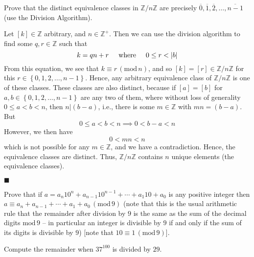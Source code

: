 \documentclass[12pt]{article}
\renewcommand{\qed}{\hfill$\blacksquare$}
\renewenvironment{proof}{\begin{addmargin}[1em]{0em}\begin{newproof}}{\end{newproof}\end{addmargin}\qed}
\newenvironment{problem}[2][Exercise]{\begin{trivlist}
\item[\hskip \labelsep {\bfseries #1}\hskip \labelsep {\bfseries #2.}]}{\end{trivlist}}
\begin{document}
\begin{problem}{0.3.2}
Prove that the distinct equivalence classes in $\mathbb{Z}/n\mathbb{Z}$ are precisely $\overline{0}, \overline{1},\overline{2},\ldots,\overline{n-1}$ (use the Division Algorithm).
\end{problem}
\begin{proof}
Let $\left[k\right]\in \mathbb{Z}$ arbitrary, and $n\in \mathbb{Z}^+$. Then we can use the division algorithm to find some $q,r \in \mathbb{Z}$ such that
$$ k = qn + r \hspace{5mm} \text{where} \hspace{5mm} 0 \leq r < \left|b\right| $$
From this equation, we see that $k \equiv r \, \left(\text{mod} \, n\right)$, and so $\left[k\right] =  \left[r\right] \in \mathbb{Z}/n\mathbb{Z}$ for this $r \in \left\{ 0,1,2,\ldots,n-1\right\}$. Hence, any arbitrary equivalence class of $\mathbb{Z}/n\mathbb{Z}$ is one of these classes. These classes are also distinct, because if $\left[a\right]= \left[b\right]$ for $a,b \in \left\{0,1,2,\ldots,n-1\right\}$ are any two of them, where without loss of generality $0\leq a <b < n$, then $n|\left(b-a\right)$, i.e., there is some $m\in \mathbb{Z}$ with $mn = \left(b-a\right)$. But $$ 0 \leq a < b < n \implies 0 < b-a < n$$
However, we then have
$$ 0 < mn < n $$
which is not possible for any $m\in \mathbb{Z}$, and we have a contradiction. Hence, the equivalence classes are distinct. Thus, $\mathbb{Z}/n\mathbb{Z}$ contains $n$ unique elements (the equivalence classes).
\end{proof}





\begin{problem}{0.3.3}
Prove that if $a=a_n 10^n + a_{n-1}10^{n-1} + \cdots + a_1 10 + a_0$ is any positive integer then $a \equiv a_n + a_{n-1} + \cdots + a_1 + a_0 \, \left(\text{mod}\, 9\right)$ (note that this is the usual arithmetic rule that the remainder after division by $9$ is the same as the sum of the decimal digits $\text{mod}\, 9$ -- in particular an integer is divisible by $9$ if and only if the sum of its digits is divisible by $9$) [note that $10 \equiv 1 \, \left(\text{mod} \, 9\right)$].
\end{problem}




\begin{problem}{0.3.4}
Compute the remainder when $37^{100}$ is divided by $29$.
\end{problem}
\end{document}
